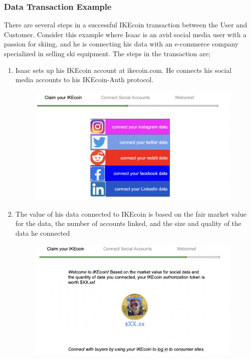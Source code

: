\documentclass[12pt, letterpaper, twoside]{article}
\begin{document}
\subsubsection*{Data Transaction Example}
There are several steps in a successful IKEcoin transaction between the User and Customer. Consider this example where Isaac is an avid social media user with a passion for skiing, and he is connecting his data with an e-commerce company specialized in selling ski equipment. The steps in the transaction are;
\begin{enumerate}

\item Isaac sets up his IKEcoin account at ikecoin.com. He connects his social media accounts to his IKEcoin-Auth protocol.
\begin{figure}[h]
\includegraphics[scale=0.3]{media/AddSocial.jpg}
\centering
\end{figure}
  
\item The value of his data connected to IKEcoin is based on the fair market value for the data, the number of accounts linked, and the size and quality of the data he connected
\begin{figure}[h]
\includegraphics[scale=0.3]{media/Welcome.jpg}
\centering
\end{figure}
   

\end{enumerate}
\end{document}

